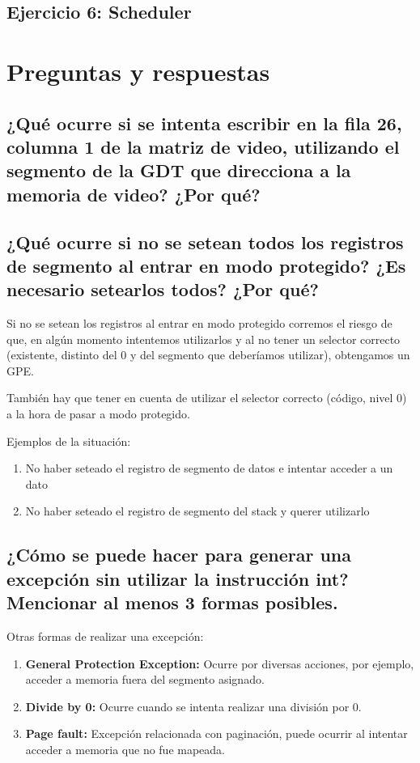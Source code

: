 \documentclass[a4paper,10pt,twoside]{article}
\begin{document}
\subsection{Ejercicio 6: Scheduler}




\section{Preguntas y respuestas}
\subsection{¿Qué ocurre si se intenta escribir en la fila 26, columna 1 de la matriz de video, utilizando el segmento de la GDT que direcciona a la memoria de video? ¿Por qué?}

\subsection{¿Qué ocurre si no se setean todos los registros de segmento al entrar en
modo protegido? ¿Es necesario setearlos todos? ¿Por qué?}
Si no se setean los registros al entrar en modo protegido corremos el riesgo de que, en algún momento intentemos utilizarlos y al no tener un selector correcto (existente, distinto del 0 y del segmento que deberíamos utilizar), obtengamos un GPE.

También hay que tener en cuenta de utilizar el selector correcto (código, nivel 0) a la hora de pasar a modo protegido.

Ejemplos de la situación:
\begin{enumerate}
	\item No haber seteado el registro de segmento de datos e intentar acceder a un dato
	\item No haber seteado el registro de segmento del stack y querer utilizarlo
\end{enumerate}

\subsection{¿Cómo se puede hacer para generar una excepción sin utilizar la instrucción int? Mencionar al menos 3 formas posibles.}
Otras formas de realizar una excepción:
\begin{enumerate}
	\item \textbf{General Protection Exception:}
	Ocurre por diversas acciones, por ejemplo, acceder a memoria fuera del segmento asignado.
	\item \textbf{Divide by 0:}
	Ocurre cuando se intenta realizar una división por 0.
	\item \textbf{Page fault:}
	Excepción relacionada con paginación, puede ocurrir al intentar acceder a memoria que no fue mapeada.
\end{enumerate}
\end{document}
